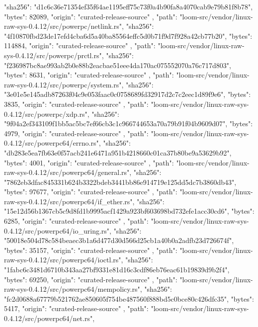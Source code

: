 {{      "sha256": "d1c6c36e71354ef35f64ae1195eff75c73f0a4b90fa8a4070cab9e79b81f8b78",
      "bytes": 82089,
      "origin": "curated-release-source"
    },
    {
      "path": "loom-src/vendor/linux-raw-sys-0.4.12/src/powerpc/netlink.rs",
      "sha256": "4f10870fbd23de17efd4cba6d5a40ba85564effc5d0b71f9d7f928a42cb77b20",
      "bytes": 114884,
      "origin": "curated-release-source"
    },
    {
      "path": "loom-src/vendor/linux-raw-sys-0.4.12/src/powerpc/prctl.rs",
      "sha256": "f236987bc8ae993ab2b0e88b2eacbae51eee4da170ac075552070a76c717d803",
      "bytes": 8631,
      "origin": "curated-release-source"
    },
    {
      "path": "loom-src/vendor/linux-raw-sys-0.4.12/src/powerpc/system.rs",
      "sha256": "3e01e5e145adb87263f04c9e053faac0c0758689fd32917d2c7c2eec1d89f9e6",
      "bytes": 3835,
      "origin": "curated-release-source"
    },
    {
      "path": "loom-src/vendor/linux-raw-sys-0.4.12/src/powerpc/xdp.rs",
      "sha256": "9f04a2ef343109f1bb5ac5bc7ef66cb3c1c966744653a70a79b91f04b9609d07",
      "bytes": 4979,
      "origin": "curated-release-source"
    },
    {
      "path": "loom-src/vendor/linux-raw-sys-0.4.12/src/powerpc64/errno.rs",
      "sha256": "db283e5ea7fb63e0f57acb241e6471a951b4218660c01ca37b80be9a53629b92",
      "bytes": 4001,
      "origin": "curated-release-source"
    },
    {
      "path": "loom-src/vendor/linux-raw-sys-0.4.12/src/powerpc64/general.rs",
      "sha256": "7862eb3dfac845331b624b3322bdeb3441bb86e914719e125dd5dc7b3860db43",
      "bytes": 97677,
      "origin": "curated-release-source"
    },
    {
      "path": "loom-src/vendor/linux-raw-sys-0.4.12/src/powerpc64/if_ether.rs",
      "sha256": "15e12d56b1367cb5c9d8fd1b9995acf1429a923bf603698bd732efe1acc30cd6",
      "bytes": 6285,
      "origin": "curated-release-source"
    },
    {
      "path": "loom-src/vendor/linux-raw-sys-0.4.12/src/powerpc64/io_uring.rs",
      "sha256": "50018e504d78c584beaec3b1a6d477d30d566d25cb1a40b0a2adfb23d726674f",
      "bytes": 35157,
      "origin": "curated-release-source"
    },
    {
      "path": "loom-src/vendor/linux-raw-sys-0.4.12/src/powerpc64/ioctl.rs",
      "sha256": "1fabc6c3481d6710b343aa27bf9331e81d16c3cdf86eb76eac61b19839d9b2f4",
      "bytes": 69250,
      "origin": "curated-release-source"
    },
    {
      "path": "loom-src/vendor/linux-raw-sys-0.4.12/src/powerpc64/mempolicy.rs",
      "sha256": "fc2d0688a67779b521762ae850605f754be487560f888bd5c0bce80c426dfc35",
      "bytes": 5417,
      "origin": "curated-release-source"
    },
    {
      "path": "loom-src/vendor/linux-raw-sys-0.4.12/src/powerpc64/net.rs",
}}
